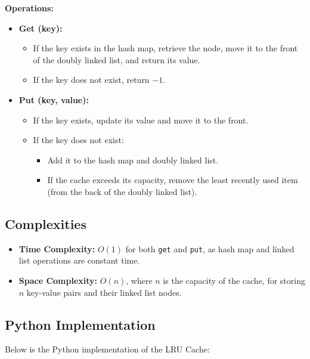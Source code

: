 \textbf{Operations:}
\begin{itemize}
    \item \textbf{Get (key):}
    \begin{itemize}
        \item If the key exists in the hash map, retrieve the node, move it to the front of the doubly linked list, and return its value.
        \item If the key does not exist, return \(-1\).
    \end{itemize}
    \item \textbf{Put (key, value):}
    \begin{itemize}
        \item If the key exists, update its value and move it to the front.
        \item If the key does not exist:
        \begin{itemize}
            \item Add it to the hash map and doubly linked list.
            \item If the cache exceeds its capacity, remove the least recently used item (from the back of the doubly linked list).
        \end{itemize}
    \end{itemize}
\end{itemize}

\subsection*{Complexities}
\begin{itemize}
    \item \textbf{Time Complexity:} \(O(1)\) for both \texttt{get} and \texttt{put}, as hash map and linked list operations are constant time.
    \item \textbf{Space Complexity:} \(O(n)\), where \(n\) is the capacity of the cache, for storing \(n\) key-value pairs and their linked list nodes.
\end{itemize}

\subsection*{Python Implementation}
Below is the Python implementation of the LRU Cache:

